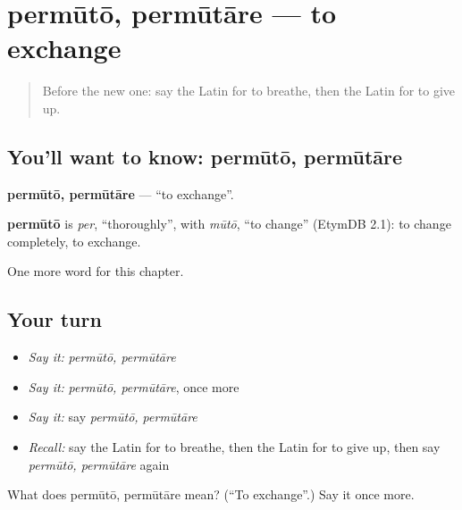 \section[permūtō, permūtāre]{permūtō, permūtāre — to exchange}

\label{lesson:LA-C259-permuto}



\begin{quote}
Before the new one: say the Latin for to breathe, then the Latin for to give up.
\end{quote}

\subsection*{You'll want to know: permūtō, permūtāre}
\textbf{permūtō, permūtāre} — \textquotedblleft{}to exchange\textquotedblright{}.

\begin{cousinweb}
\textbf{permūtō} is \emph{per}, \textquotedblleft{}thoroughly\textquotedblright{}, with \emph{mūtō}, \textquotedblleft{}to change\textquotedblright{} (EtymDB 2.1): to change completely, to exchange.
\end{cousinweb}

\begin{grammarlens}[title={What you've built}]
One more word for this chapter.
\end{grammarlens}

\subsection*{Your turn}
\begin{itemize}
\raggedright
  \item \emph{Say it:} \emph{permūtō, permūtāre}
  \item \emph{Say it:} \emph{permūtō, permūtāre}, once more
  \item \emph{Say it:} say \emph{permūtō, permūtāre}
  \item \emph{Recall:} say the Latin for to breathe, then the Latin for to give up, then say \emph{permūtō, permūtāre} again
\end{itemize}

\begin{tcolorbox}[breakable,colback=teal!4,colframe=teal!35!black,title={Before you move on}]
What does permūtō, permūtāre mean? (\textquotedblleft{}To exchange\textquotedblright{}.) Say it once more.
\end{tcolorbox}
